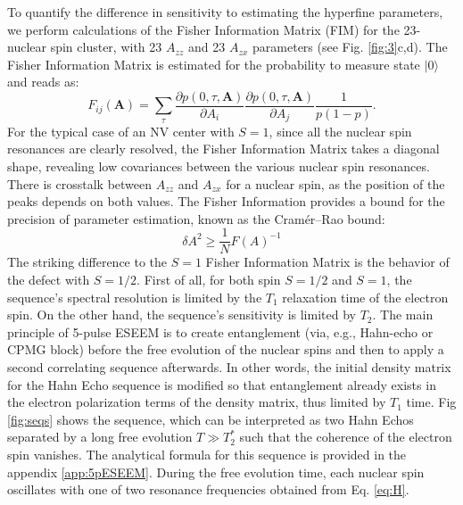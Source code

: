 \documentclass[%
 reprint,
superscriptaddress,
 amsmath,amssymb,
 aps,
]{revtex4-2}
\begin{document}
To quantify the difference in sensitivity to estimating the hyperfine parameters, we perform calculations of the Fisher Information Matrix (FIM) for the 23-nuclear spin cluster, with 23 $A_{zz}$ and 23 $A_{zx}$ parameters (see Fig. \ref{fig:3}c,d).
The Fisher Information Matrix is estimated for the probability to measure state $|0\rangle$ and reads as: 
\begin{equation}
	F_{ij}(\textbf{A})=\sum_\tau \frac{\partial p(0, \tau, \textbf{A})}{\partial A_i}\frac{\partial p(0, \tau, \textbf{A})}{ \partial A_j} \frac{1}{p (1-p)}.
\end{equation}
For the typical case of an NV center with $S=1$, since all the nuclear spin resonances are clearly resolved, the Fisher Information Matrix takes a diagonal shape, revealing low covariances between the various nuclear spin resonances.
There is crosstalk between $A_{zz}$ and $A_{zx}$ for a nuclear spin, as the position of the peaks depends on both values.
The Fisher Information provides a bound for the precision of parameter estimation, known as the Cramér–Rao bound: 
\begin{equation}
	\delta A^2 \ge \frac{1}{N} F(A)^{-1}
\end{equation}
The striking difference to the $S=1$ Fisher Information Matrix is the behavior of the defect with $S=1/2$.
First of all, for both spin $S=1/2$ and $S=1$, the sequence's spectral resolution is limited by the $T_1$ relaxation time of the electron spin.
On the other hand, the sequence's sensitivity is limited by $T_2$.
The main principle of 5-pulse ESEEM \cite{kasumaj20085} is to create entanglement (via, e.g., Hahn-echo or CPMG block) before the free evolution of the nuclear spins and then to apply a second correlating sequence afterwards.
In other words, the initial density matrix for the Hahn Echo sequence is modified so that entanglement already exists in the electron polarization terms of the density matrix, thus limited by $T_1$ time.
Fig \ref{fig:seqs} shows the sequence, which can be interpreted as two Hahn Echos separated by a long free evolution $T\gg T_2^\ast$ such that the coherence of the electron spin vanishes. The analytical formula for this sequence is provided in the appendix \ref{app:5pESEEM}.
During the free evolution time, each nuclear spin oscillates with one of two resonance frequencies obtained from Eq. \ref{eq:H}.
\end{document}
